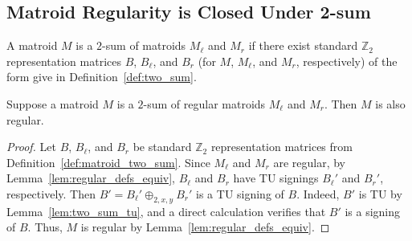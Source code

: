 \subsection{Matroid Regularity is Closed Under 2-sum}

\begin{definition}\label{def:matroid_two_sum}
    A matroid $M$ is a $2$-sum of matroids $M_{\ell}$ and $M_{r}$ if there exist standard $\mathbb{Z}_{2}$ representation matrices $B$, $B_{\ell}$, and $B_{r}$ (for $M$, $M_{\ell}$, and $M_{r}$, respectively) of the form give in Definition~\ref{def:two_sum}.
\end{definition}

\begin{lemma}\label{lem:matroid_two_sum_reg}
    Suppose a matroid $M$ is a $2$-sum of regular matroids $M_{\ell}$ and $M_{r}$. Then $M$ is also regular.
\end{lemma}

\begin{proof}
    Let $B$, $B_{\ell}$, and $B_{r}$ be standard $\mathbb{Z}_{2}$ representation matrices from Definition~\ref{def:matroid_two_sum}. Since $M_{\ell}$ and $M_{r}$ are regular, by Lemma~\ref{lem:regular_defs_equiv}, $B_{\ell}$ and $B_{r}$ have TU signings $B_{\ell}'$ and $B_{r}'$, respectively. Then $B' = B_{\ell}' \oplus_{2, x, y} B_{r}'$ is a TU signing of $B$. Indeed, $B'$ is TU by Lemma~\ref{lem:two_sum_tu}, and a direct calculation verifies that $B'$ is a signing of $B$. Thus, $M$ is regular by Lemma~\ref{lem:regular_defs_equiv}.
\end{proof}
